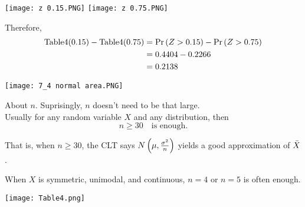 \texttt{[image: z 0.15.PNG]}
\texttt{[image: z 0.75.PNG]}

\nl Therefore, 
\begin{align*}
    \text{Table4}(0.15) - \text{Table4}(0.75) &= \P{Z > 0.15} - \P{Z > 0.75}\\ &= 0.4404 - 0.2266 \\ &= 0.2138
\end{align*}

\texttt{[image: 7\_4 normal area.PNG]}

\disc* About $n$. Suprisingly,  $n$ doesn't need to be that large.\\Usually for any random variable $X$ and any distribution, then
$$\boxed{n \geq 30 \quad \text{is enough.}}$$

\noindent
That is, when $n \geq 30$, the CLT says $\normalDist{\mu}{\frac{\sigma^2}{n}}$ yields a good approximation of $\bar{X}$.

\nl When $X$ is symmetric, unimodal, and continuous, $n = 4$ or $n = 5$ is often enough. 

\newpage
{}
\noindent\begin{center}\texttt{[image: Table4.png]}
\end{center}